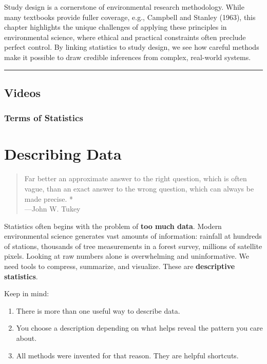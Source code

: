 \documentclass[
  letterpaper,
  DIV=11,
  numbers=noendperiod]{scrreprt}
\providecommand{\tightlist}{%
  \setlength{\itemsep}{0pt}\setlength{\parskip}{0pt}}\usepackage{longtable,booktabs,array}
\begin{document}
Study design is a cornerstone of environmental research methodology.
While many textbooks provide fuller coverage, e.g., Campbell and Stanley
(1963), this chapter highlights the unique challenges of applying these
principles in environmental science, where ethical and practical
constraints often preclude perfect control. By linking statistics to
study design, we see how careful methods make it possible to draw
credible inferences from complex, real-world systems.

\begin{center}\rule{0.5\linewidth}{0.5pt}\end{center}

\section{Videos}\label{videos}

\subsection{Terms of Statistics}\label{terms-of-statistics}


\chapter{Describing Data}\label{DescribingData}

\begin{quote}
Far better an approximate answer to the right question, which is often
vague, than an exact answer to the wrong question, which can always be
made precise. *\\
---John W. Tukey
\end{quote}

Statistics often begins with the problem of \textbf{too much data}.
Modern environmental science generates vast amounts of information:
rainfall at hundreds of stations, thousands of tree measurements in a
forest survey, millions of satellite pixels. Looking at raw numbers
alone is overwhelming and uninformative. We need tools to compress,
summarize, and visualize. These are \textbf{descriptive statistics}.

Keep in mind:

\begin{enumerate}
\def\labelenumi{\arabic{enumi}.}
\tightlist
\item
  There is more than one useful way to describe data.
\item
  You choose a description depending on what helps reveal the pattern
  you care about.
\item
  All methods were invented for that reason. They are helpful shortcuts.
\end{enumerate}
\end{document}
